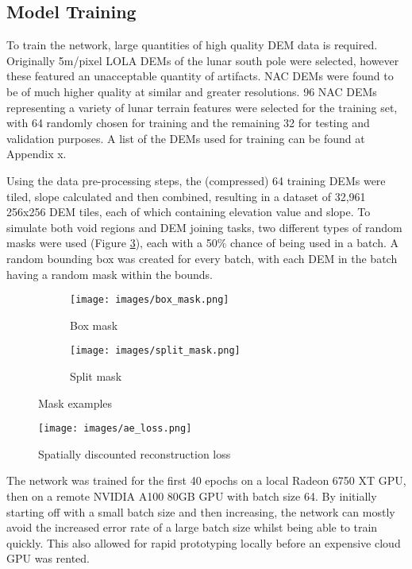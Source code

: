 \documentclass[twocolumn]{article}
\begin{document}
\subsection{Model Training}
\label{sec:org738c8fd}

To train the network, large quantities of high quality DEM data is required.
Originally 5m/pixel LOLA DEMs of the lunar south pole were selected, however these featured an unacceptable quantity of artifacts.
NAC DEMs were found to be of much higher quality at similar and greater resolutions.
96 NAC DEMs\autocite{LROCRDRProduct} representing a variety of lunar terrain features were selected for the training set, with 64 randomly chosen for training and the remaining 32 for testing and validation purposes.
A list of the DEMs used for training can be found at Appendix x.

Using the data pre-processing steps, the (compressed) 64 training DEMs were tiled, slope calculated and then combined, resulting in a dataset of 32,961 256x256 DEM tiles, each of which containing elevation value and slope.
To simulate both void regions and DEM joining tasks, two different types of random masks were used (Figure \ref{fig:masks}), each with a 50\% chance of being used in a batch.
A random bounding box was created for every batch, with each DEM in the batch having a random mask within the bounds.

\begin{figure}
\centering
\begin{subfigure}{0.4\columnwidth}
    \caption{Box mask}
    \texttt{[image: images/box\_mask.png]}
    \label{fig:box_mask}
\end{subfigure}
\hfill
\begin{subfigure}{0.4\columnwidth}
    \caption{Split mask}
    \texttt{[image: images/split\_mask.png]}
    \label{fig:blended}
\end{subfigure}
\caption{\label{fig:masks}Mask examples}
\end{figure}

\begin{figure}[htbp]
\centering
\texttt{[image: images/ae\_loss.png]}
\caption{\label{fig:ae_loss}Spatially discounted reconstruction loss}
\end{figure}

The network was trained for the first 40 epochs on a local Radeon 6750 XT GPU, then on a remote NVIDIA A100 80GB GPU with batch size 64.
By initially starting off with a small batch size and then increasing, the network can mostly avoid the increased error rate of a large batch size whilst being able to train quickly\autocite{devarakondaAdaBatchAdaptiveBatch2018}.
This also allowed for rapid prototyping locally before an expensive cloud GPU was rented.
\end{document}
